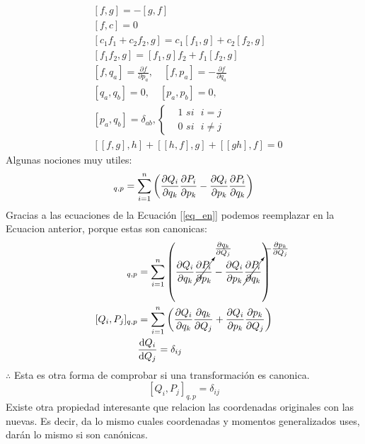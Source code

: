 \documentclass[12pt]{article}
\newcommand{\en}[1]{\[\boxed{#1}\]}
\newcommand{\sumn}[1]{\sum_{#1 =1}^{n}}
\newcommand{\eqreff}[1]{Ecuación [\ref{#1}]}
\newcommand{\rojo}[1]{{\color{rojo}#1}}
\begin{document}
\begin{align}
	&{[f, g]=-[g, f]} \\
 &{[f, c]=0} \\
&{\left[c_{1} f_{1}+c_{2} f_{2}, g\right]=c_{1}\left[f_{1}, g\right]+c_{2}\left[f_{2}, g\right]} \\
&{\left[f_{1} f_{2}, g\right]=\left[f_{1}, g\right] f_{2}+f_{1}\left[f_{2}, g\right]} \\
&{\left[f, q_{a}\right]=\frac{\partial f}{\partial p_{a}}, \quad\left[f, p_{a}\right]=-\frac{\partial f}{\partial q_{a}}} \\
&{\left[q_{a}, q_{b}\right]=0, \quad\left[p_{a}, p_{b}\right]=0,} \\
&{\left[p_{a}, q_{b}\right]=\delta_{a b},}
\begin{cases}
&1 \,\, si \,\,\,\,i=j\\	
&0\,\, si  \,\,\,\,i \neq j
\end{cases}
\\
&{[[f, g], h]+[[h, f], g]+[[g h], f]=0}
\end{align}
Algunas nociones muy utiles:
\begin{align}
	[Q_i,P_j]_{q,p}= \sumn{i} \qty(\pdv{Q_i}{q_k} \pdv{P_i}{p_k} - \pdv{Q_i}{p_k} \pdv{P_i}{q_k})
\end{align}
Gracias a las ecuaciones de la \eqreff{eq_en} podemos reemplazar en la Ecuacion anterior, porque estas son canonicas:
\begin{align}
		[Q_i,P_j]_{q,p}&= \sumn{i} \qty(\pdv{Q_i}{q_k} \cancelto{\pdv{q_k}{Q_j}}{\pdv{P_i}{p_k}} - \pdv{Q_i}{p_k}\cancelto{- \pdv{p_k}{Q_j}}{ \pdv{P_i}{q_k}})\\
		[Q_i,P_j]_{q,p}&= \sumn{i} \qty(\pdv{Q_i}{q_k} \pdv{q_k}{Q_j} + \pdv{Q_i}{p_k}\pdv{p_k}{Q_j})\\
		&\dv{Q_i}{Q_j}= \delta_{ij} \nonumber
\end{align}
$\therefore$ Esta es otra forma de comprobar si una transformación es canonica.
\rojo{\en{[Q_i,P_j]_{q,p}= \delta_{ij}}}
Existe otra propiedad interesante que relacion las coordenadas originales con las nuevas. Es decir, da lo mismo cuales coordenadas y momentos generalizados uses, darán lo mismo si son canónicas.
\end{document}
